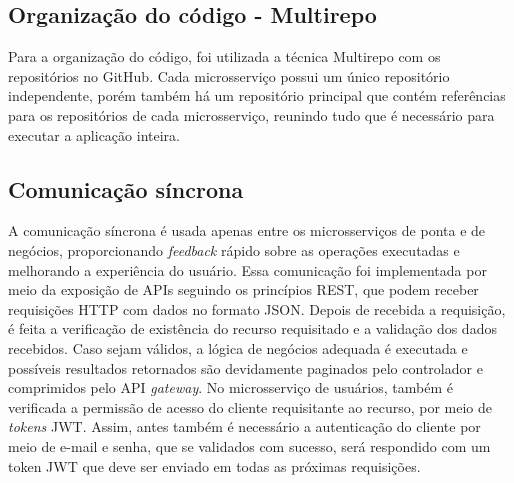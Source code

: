
\subsection{Organização do código - Multirepo}
Para a organização do código, foi utilizada a técnica Multirepo com os repositórios no GitHub. Cada microsserviço possui um único repositório independente, porém também há um repositório principal que contém referências para os repositórios de cada microsserviço, reunindo tudo que é necessário para executar a aplicação inteira.




\subsection{Comunicação síncrona}
A comunicação síncrona é usada apenas entre os microsserviços de ponta e de negócios, proporcionando \emph{feedback} rápido sobre as operações executadas e melhorando a experiência do usuário. 
Essa comunicação foi implementada por meio da exposição de APIs seguindo os princípios REST, que podem receber requisições HTTP com dados no formato JSON. Depois de recebida a requisição, é feita a verificação de existência do recurso requisitado e a validação dos dados recebidos. Caso sejam válidos, a lógica de negócios adequada é executada e possíveis resultados retornados são devidamente paginados pelo controlador e comprimidos pelo API \emph{gateway}. No microsserviço de usuários, também é verificada a permissão de acesso do cliente requisitante ao recurso, por meio de \emph{tokens} JWT. Assim, antes também é necessário a autenticação do cliente por meio de e-mail e senha, que se validados com sucesso, será respondido com um token JWT que deve ser enviado em todas as próximas requisições.

